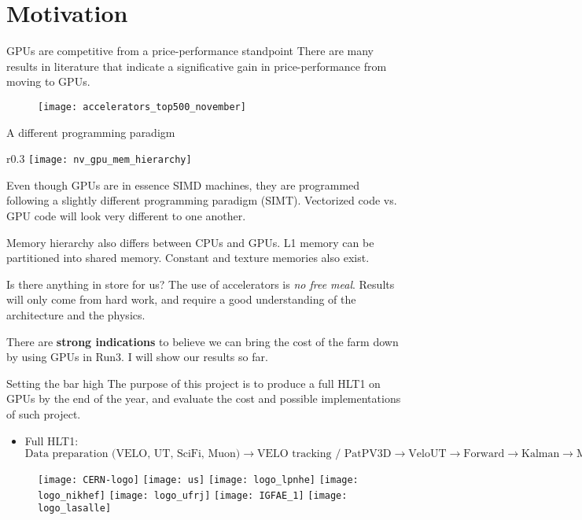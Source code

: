 \section{Motivation}

\begin{frame}{GPUs are competitive from a price-performance standpoint}
There are many results in literature that indicate a significative gain in price-performance from moving to GPUs.

\begin{figure}
\texttt{[image: accelerators\_top500\_november]}
\end{figure}
\end{frame}

\begin{frame}{A different programming paradigm}
\begin{wrapfigure}{r}{0.3\textwidth} 
\texttt{[image: nv\_gpu\_mem\_hierarchy]}
\end{wrapfigure}

Even though GPUs are in essence SIMD machines, they are programmed following a slightly different programming paradigm (SIMT). Vectorized code vs. GPU code will look very different to one another.

Memory hierarchy also differs between CPUs and GPUs. L1 memory can be partitioned into shared memory. Constant and texture memories also exist.
\end{frame}

\begin{frame}{Is there anything in store for us?}
The use of accelerators is \emph{no free meal}. Results will only come from hard work, and require a good understanding of the architecture and the physics.

There are \textbf{strong indications} to believe we can bring the cost of the farm down by using GPUs in Run3. I will show our results so far.
\end{frame}

\begin{frame}{Setting the bar high}
The purpose of this project is to produce a full HLT1 on GPUs by the end of the year, and evaluate the cost and possible implementations of such project.

\begin{itemize}
\item Full HLT1: $\text{Data preparation (VELO, UT, SciFi, Muon)} \rightarrow \text{VELO tracking / PatPV3D} \rightarrow \text{VeloUT} \rightarrow \text{Forward} \rightarrow \text{Kalman} \rightarrow \text{MuonID}$
\end{itemize}

\begin{figure}
\texttt{[image: CERN-logo]}
\quad
\texttt{[image: us]}
\quad
\texttt{[image: logo\_lpnhe]}
\quad
\texttt{[image: logo\_nikhef]}
\quad
\texttt{[image: logo\_ufrj]}
\quad
\texttt{[image: IGFAE\_1]}
\quad
\texttt{[image: logo\_lasalle]}
\end{figure}
\end{frame}

